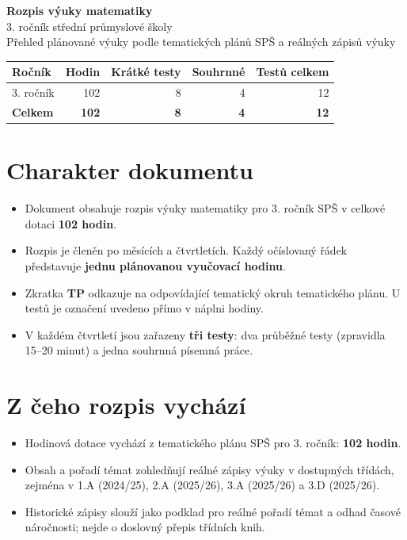\documentclass[10pt,a4paper]{article}
\begin{document}
\begin{center}
{\LARGE\bfseries Rozpis výuky matematiky}\\[3mm]
{\large 3. ročník střední průmyslové školy}\\[3mm]
{\small Přehled plánované výuky podle tematických plánů SP\v{S} a reálných zápisů výuky}
\end{center}
\vspace{3mm}
\begin{tabularx}{\textwidth}{@{}Xrrrr@{}}\toprule
\textbf{Ročník} & \textbf{Hodin} & \textbf{Krátké testy} & \textbf{Souhrnné} & \textbf{Testů celkem}\\\midrule
3. ročník & 102 & 8 & 4 & 12\\\midrule
\textbf{Celkem} & \textbf{102} & \textbf{8} & \textbf{4} & \textbf{12}\\\bottomrule
\end{tabularx}
\vspace{4mm}
\section*{Charakter dokumentu}
\begin{itemize}\setlength{\itemsep}{2pt}
\item Dokument obsahuje rozpis výuky matematiky pro 3. ročník SP\v{S} v celkové dotaci \textbf{102 hodin}.
\item Rozpis je členěn po měsících a čtvrtletích. Každý očíslovaný řádek představuje \textbf{jednu plánovanou vyučovací hodinu}.
\item Zkratka \textbf{TP} odkazuje na odpovídající tematický okruh tematického plánu. U testů je označení uvedeno přímo v náplni hodiny.
\item V každém čtvrtletí jsou zařazeny \textbf{tři testy}: dva průběžné testy (zpravidla 15--20 minut) a jedna souhrnná písemná práce.
\end{itemize}

\section*{Z čeho rozpis vychází}
\begin{itemize}\setlength{\itemsep}{2pt}
\item Hodinová dotace vychází z tematického plánu SP\v{S} pro 3. ročník: \textbf{102 hodin}.
\item Obsah a pořadí témat zohledňují reálné zápisy výuky v dostupných třídách, zejména v 1.A (2024/25), 2.A (2025/26), 3.A (2025/26) a 3.D (2025/26).
\item Historické zápisy slouží jako podklad pro reálné pořadí témat a odhad časové náročnosti; nejde o doslovný přepis třídních knih.
\end{itemize}
\end{document}
